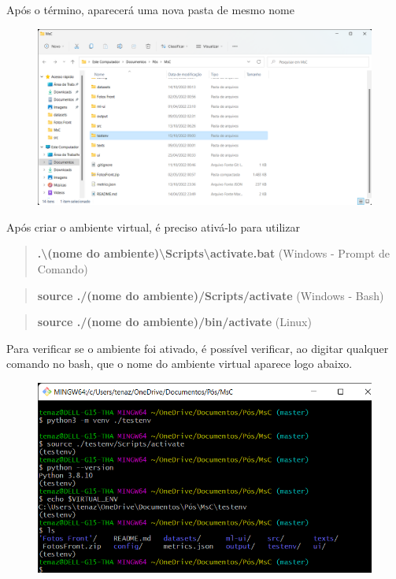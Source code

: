 \documentclass[Portugues,Final]{ic-tese-v3}
\begin{document}
Após o término, aparecerá uma nova pasta de mesmo nome

\begin{figure}[H]
\centering
\includegraphics[scale=0.25]{images/doc-install/virtualenv.png}
\label{fig:DocInstallVirtualEnvFolder}
\end{figure}

Após criar o ambiente virtual, é preciso ativá-lo para utilizar

\begin{quote}
\textbf{.\textbackslash (nome do ambiente)\textbackslash Scripts\textbackslash activate.bat} (Windows - Prompt de Comando)
\end{quote}
\begin{quote}
\textbf{source ./(nome do ambiente)/Scripts/activate} (Windows - Bash)
\end{quote}
\begin{quote}
\textbf{source ./(nome do ambiente)/bin/activate} (Linux)
\end{quote}

Para verificar se o ambiente foi ativado, é possível verificar, ao digitar qualquer comando no bash, que o nome do ambiente virtual aparece logo abaixo.

\begin{figure}[h!]
\centering
\includegraphics[scale=0.4]{images/doc-install/virtualenv-check.png}
\label{fig:DocInstallVirtualEnvCheck}
\end{figure}
\end{document}
